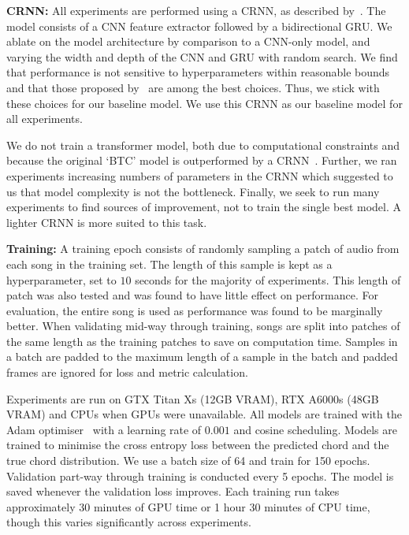 \textbf{CRNN:} All experiments are performed using a CRNN, as described by~\cite{StructuredTraining}. The model consists of a CNN feature extractor followed by a bidirectional GRU. We ablate on the model architecture by comparison to a CNN-only model, and varying the width and depth of the CNN and GRU with random search. We find that performance is not sensitive to hyperparameters within reasonable bounds and that those proposed by~\cite{StructuredTraining} are among the best choices. Thus, we stick with these choices for our baseline model. We use this CRNN as our baseline model for all experiments.

We do not train a transformer model, both due to computational constraints and because the original `BTC' model is outperformed by a CRNN~\cite{BTC}. Further, we ran experiments increasing numbers of parameters in the CRNN which suggested to us that model complexity is not the bottleneck. Finally, we seek to run many experiments to find sources of improvement, not to train the single best model. A lighter CRNN is more suited to this task.

\textbf{Training:} A training epoch consists of randomly sampling a patch of audio from each song in the training set. The length of this sample is kept as a hyperparameter, set to $10$ seconds for the majority of experiments. This length of patch was also tested and was found to have little effect on performance. For evaluation, the entire song is used as performance was found to be marginally better. When validating mid-way through training, songs are split into patches of the same length as the training patches to save on computation time. Samples in a batch are padded to the maximum length of a sample in the batch and padded frames are ignored for loss and metric calculation.

Experiments are run on GTX Titan Xs (12GB VRAM), RTX A6000s (48GB VRAM) and CPUs when GPUs were unavailable. All models are trained with the Adam optimiser~\cite{adam} with a learning rate of $0.001$ and cosine scheduling. Models are trained to minimise the cross entropy loss between the predicted chord and the true chord distribution. We use a batch size of 64 and train for 150 epochs. Validation part-way through training is conducted every 5 epochs. The model is saved whenever the validation loss improves. Each training run takes approximately 30 minutes of GPU time or 1 hour 30 minutes of CPU time, though this varies significantly across experiments.



